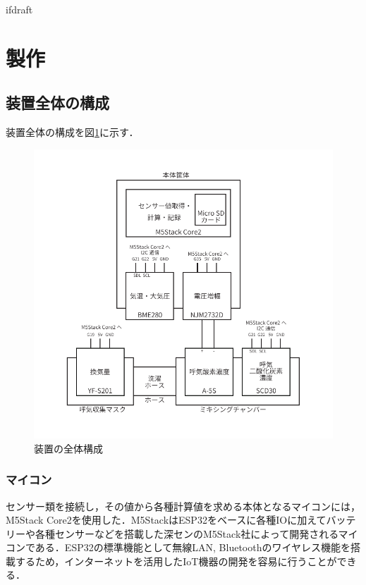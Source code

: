 \expandafter\ifx\csname ifdraft\endcsname\relax
 
\fi

\section{製作}

\subsection{装置全体の構成}

装置全体の構成を図\ref{fig:connection_map}に示す．

\begin{figure}[H]
  \begin{center}
    \includegraphics[width=12cm]{fig/connection_map}
    \caption{装置の全体構成}
    \label{fig:connection_map}
  \end{center}
\end{figure}

\subsubsection{マイコン}

センサー類を接続し，その値から各種計算値を求める本体となるマイコンには，M5Stack Core2を使用した．M5StackはESP32をベースに各種IOに加えてバッテリーや各種センサーなどを搭載した深センのM5Stack社によって開発されるマイコンである．ESP32の標準機能として無線LAN, Bluetoothのワイヤレス機能を搭載するため，インターネットを活用したIoT機器の開発を容易に行うことができる．

